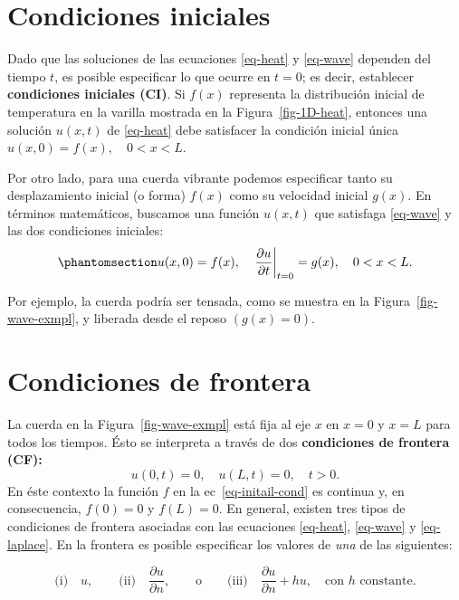 \documentclass[
  spanish,
  us-letterpaper,
]{scrreprt}
\theoremstyle{plain}
\theoremstyle{definition}
\theoremstyle{remark}
\begin{document}
\section{Condiciones iniciales}\label{condiciones-iniciales}

Dado que las soluciones de las ecuaciones \ref{eq-heat} y \ref{eq-wave}
dependen del tiempo \(t\), es posible especificar lo que ocurre en
\(t = 0\); es decir, establecer \textbf{condiciones iniciales (CI)}. Si
\(f(x)\) representa la distribución inicial de temperatura en la varilla
mostrada en la Figura~\ref{fig-1D-heat}, entonces una solución
\(u(x, t)\) de \ref{eq-heat} debe satisfacer la condición inicial única
\(u(x, 0) = f(x), \quad 0 < x < L\).

Por otro lado, para una cuerda vibrante podemos especificar tanto su
desplazamiento inicial (o forma) \(f(x)\) como su velocidad inicial
\(g(x)\). En términos matemáticos, buscamos una función \(u(x, t)\) que
satisfaga \ref{eq-wave} y las dos condiciones iniciales:
\begin{equation}\phantomsection\label{eq-initail-cond}{
u(x, 0) = f(x), \quad \left. \frac{\partial u}{\partial t} \right|_{t=0} = g(x), \quad 0 < x < L.
}\end{equation}

Por ejemplo, la cuerda podría ser tensada, como se muestra en la
Figura~\ref{fig-wave-exmpl}, y liberada desde el reposo \((g(x)=0)\).

\section{Condiciones de frontera}\label{condiciones-de-frontera}

La cuerda en la Figura~\ref{fig-wave-exmpl} está fija al eje \(x\) en
\(x=0\) y \(x=L\) para todos los tiempos. Ésto se interpreta a través de
dos \textbf{condiciones de frontera (CF):} \[
u(0,t) = 0, \quad u(L,t)=0, \quad t>0.
\] En éste contexto la función \(f\) en la ec~\ref{eq-initail-cond} es
continua y, en consecuencia, \(f(0)=0\) y \(f(L)=0\). En general,
existen tres tipos de condiciones de frontera asociadas con las
ecuaciones \ref{eq-heat}, \ref{eq-wave} y \ref{eq-laplace}. En la
frontera es posible especificar los valores de \emph{una} de las
siguientes:

\[
\text{(i)}\quad u, \qquad \text{(ii)}\quad \dfrac{\partial u}{\partial n},\qquad \text{o}\qquad \text{(iii)}\quad \dfrac{\partial u}{\partial n} + hu,\quad \text{con $h$ constante.}
\]
\end{document}

